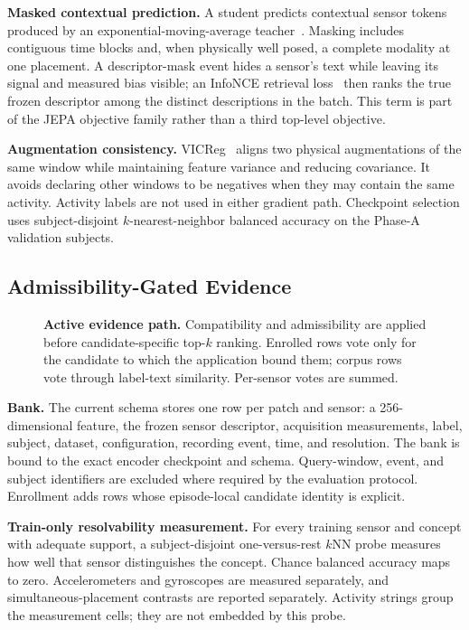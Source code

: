 \textbf{Masked contextual prediction.} A student predicts contextual sensor tokens produced by an
exponential-moving-average teacher~\cite{byol,data2vec,ijepa}. Masking includes contiguous time
blocks and, when physically well posed, a complete modality at one placement. A descriptor-mask
event hides a sensor's text while leaving its signal and measured bias visible; an InfoNCE
retrieval loss~\cite{infonce}
then ranks the true frozen descriptor among the distinct descriptions in the batch. This term is
part of the JEPA objective family rather than a third top-level objective.

\textbf{Augmentation consistency.} VICReg~\cite{vicreg} aligns two physical augmentations of the
same window while maintaining feature variance and reducing covariance. It avoids declaring other
windows to be negatives when they may contain the same activity. Activity labels are not used in
either gradient path. Checkpoint selection uses subject-disjoint $k$-nearest-neighbor balanced
accuracy on the Phase-A validation subjects.

\subsection{Admissibility-Gated Evidence}
\label{sec:evidence_design}

\begin{figure}[t]
  \centering
  \setlength{\abovecaptionskip}{4pt}
  \setlength{\belowcaptionskip}{-4pt}
  
  \caption{\textbf{Active evidence path.} Compatibility and admissibility are applied before
  candidate-specific top-$k$ ranking. Enrolled rows vote only for the candidate to which the
  application bound them; corpus rows vote through label-text similarity. Per-sensor votes are
  summed.}
  \label{fig:evidence}
\end{figure}

\textbf{Bank.} The current schema stores one row per patch and sensor: a 256-dimensional feature,
the frozen sensor descriptor, acquisition measurements, label, subject, dataset, configuration,
recording event, time, and resolution. The bank is bound to the exact encoder checkpoint and schema.
Query-window, event, and subject identifiers are excluded where required by the evaluation
protocol. Enrollment adds rows whose episode-local candidate identity is explicit.

\textbf{Train-only resolvability measurement.} For every training sensor and concept with adequate
support, a subject-disjoint one-versus-rest $k$NN probe measures how well that sensor distinguishes
the concept. Chance balanced accuracy maps to zero. Accelerometers and gyroscopes are measured
separately, and simultaneous-placement contrasts are reported separately. Activity strings group
the measurement cells; they are not embedded by this probe.

